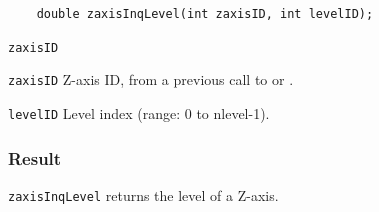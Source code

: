 \begin{verbatim}
    double zaxisInqLevel(int zaxisID, int levelID);
\end{verbatim}

\hspace*{4mm}\begin{minipage}[]{15cm}
\begin{deflist}{\texttt{zaxisID}\ }
\item[\texttt{zaxisID}]
Z-axis ID, from a previous call to {} or {}.
\item[\texttt{levelID}]
Level index (range: 0 to nlevel-1).

\end{deflist}
\end{minipage}

\subsubsection*{Result}

{\texttt{zaxisInqLevel}} returns the level of a Z-axis.
